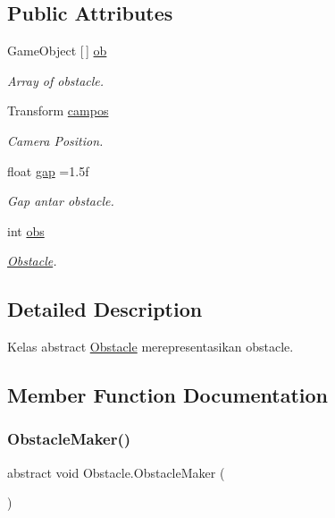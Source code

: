 \subsection*{Public Attributes}
\begin{DoxyCompactItemize}
\item 
Game\+Object \mbox{[}$\,$\mbox{]} \hyperlink{class_obstacle_a388c8e33dc5a1378f622c048891d0306}{ob}
\begin{DoxyCompactList}\small\item\em Array of obstacle. \end{DoxyCompactList}\item 
Transform \hyperlink{class_obstacle_ad1f3a9f914fb5fbe9367143d8d20ed67}{campos}
\begin{DoxyCompactList}\small\item\em Camera Position. \end{DoxyCompactList}\item 
float \hyperlink{class_obstacle_a84513c71d850ac7c67915fcee2d3df1b}{gap} =1.\+5f
\begin{DoxyCompactList}\small\item\em Gap antar obstacle. \end{DoxyCompactList}\item 
int \hyperlink{class_obstacle_a079bd35101bc96d528ef7246f28de6ea}{obs}
\begin{DoxyCompactList}\small\item\em \hyperlink{class_obstacle}{Obstacle}. \end{DoxyCompactList}\end{DoxyCompactItemize}


\subsection{Detailed Description}
Kelas abstract \hyperlink{class_obstacle}{Obstacle} merepresentasikan obstacle. 



\subsection{Member Function Documentation}
\hypertarget{class_obstacle_a19f2f5d2c3176ee9ea8840862c55aa42}{}\label{class_obstacle_a19f2f5d2c3176ee9ea8840862c55aa42} 
\subsubsection{\texorpdfstring{Obstacle\+Maker()}{ObstacleMaker()}}
{\footnotesize\ttfamily abstract void Obstacle.\+Obstacle\+Maker (\begin{DoxyParamCaption}{ }\end{DoxyParamCaption})\hspace{0.3cm}{\ttfamily [pure virtual]}}



